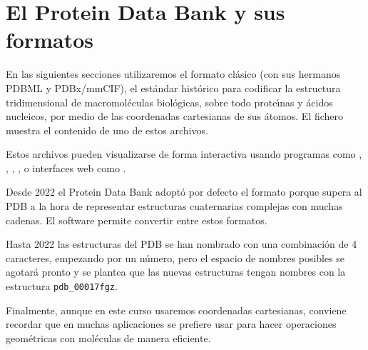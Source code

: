 \section{El Protein Data Bank y sus formatos} \label{PDBformat}

En las siguientes secciones utilizaremos el formato cl\'{a}sico
(con sus hermanos PDBML y PDBx/mmCIF),
el est\'{a}ndar hist\'{o}rico para codificar la estructura tridimensional de macromol\'{e}culas biol\'{o}gicas, 
sobre todo prote\'\i{}nas y \'{a}cidos nucleicos, por medio de las coordenadas cartesianas de sus \'{a}tomos.
El fichero 
 muestra el contenido de uno de estos archivos.

Estos archivos pueden visualizarse de forma interactiva usando programas como 
,
,
,
,
o interfaces web como 
.

Desde 2022 el Protein Data Bank adopt\'{o} por defecto el formato 
 porque supera al PDB a la hora de 
representar estructuras cuaternarias complejas con muchas cadenas. 
El software
 permite convertir entre 
estos formatos.

Hasta 2022 las estructuras del PDB se han nombrado con una combinaci\'{o}n de 4 caracteres, 
empezando por un n\'{u}mero, pero el espacio de nombres posibles se agotar\'{a} pronto y se plantea
que las nuevas estructuras tengan nombres con la estructura \verb+pdb_00017fgz+.

Finalmente, 
aunque en este curso usaremos coordenadas cartesianas, conviene recordar que en muchas aplicaciones
se prefiere usar  
para hacer operaciones geom\'{e}tricas con mol\'{e}culas de manera eficiente.

